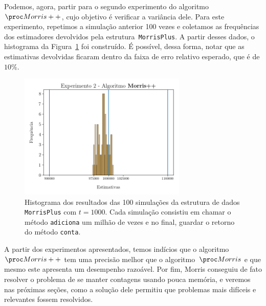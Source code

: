 Podemos, agora, partir para o segundo experimento do algoritmo~$\Morrispp$, cujo objetivo é verificar a variância dele.
Para este experimento, repetimos a simulação anterior 100 vezes e coletamos as frequências dos estimadores devolvidos
pela estrutura~\texttt{MorrisPlus}. A partir desses dados, o histograma da Figura~\ref{fig:morris:plus:variance} foi 
construído. É possível, dessa forma, notar que as estimativas devolvidas ficaram dentro da faixa de erro relativo 
esperado, que é de $10\%$.

\begin{figure}[h]
  \centering
  \includegraphics[height=6cm, width=\textwidth]{figuras/morris_plus_variance.png}
	\caption{Histograma dos resultados das 100 simulações da estrutura de dados \texttt{MorrisPlus} com $t = 1000$. Cada 
  simulação consistiu em chamar o método \texttt{adiciona} um milhão de vezes e no final, guardar o retorno do método 
  \texttt{conta}.}
  \label{fig:morris:plus:variance}
\end{figure}

A partir dos experimentos apresentados, temos indícios que o algoritmo~$\Morrispp$ tem uma precisão melhor que o 
algoritmo~$\Morris$ e que mesmo este apresenta um desempenho razoável. Por fim, Morris conseguiu de fato resolver o 
problema de se manter contagens usando pouca memória, e veremos nas próximas seções, como a solução dele permitiu que
problemas mais difíceis e relevantes fossem resolvidos.
 